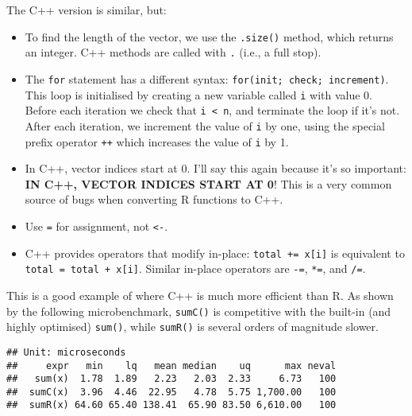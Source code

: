 The C++ version is similar, but:

\begin{itemize}
\item
  To find the length of the vector, we use the \texttt{.size()} method,
  which returns an integer. C++ methods are called with \texttt{.}
  (i.e., a full stop).
\item
  The \texttt{for} statement has a different syntax:
  \texttt{for(init;\ check;\ increment)}. This loop is initialised by
  creating a new variable called \texttt{i} with value 0. Before each
  iteration we check that \texttt{i\ \textless{}\ n}, and terminate the
  loop if it's not. After each iteration, we increment the value of
  \texttt{i} by one, using the special prefix operator \texttt{++} which
  increases the value of \texttt{i} by 1.
\item
  In C++, vector indices start at 0. I'll say this again because it's so
  important: \textbf{IN C++, VECTOR INDICES START AT 0}! This is a very
  common source of bugs when converting R functions to C++.
\item
  Use \texttt{=} for assignment, not \texttt{\textless{}-}.
\item
  C++ provides operators that modify in-place:
  \texttt{total\ +=\ x{[}i{]}} is equivalent to
  \texttt{total\ =\ total\ +\ x{[}i{]}}. Similar in-place operators are
  \texttt{-=}, \texttt{*=}, and \texttt{/=}.
\end{itemize}

This is a good example of where C++ is much more efficient than R. As
shown by the following microbenchmark, \texttt{sumC()} is competitive
with the built-in (and highly optimised) \texttt{sum()}, while
\texttt{sumR()} is several orders of magnitude slower.

\begin{Shaded}
\begin{Highlighting}[]
\StringTok{ }\NormalTok{(}\NormalTok{)}
\NormalTok{(}
\NormalTok{)}
\end{Highlighting}
\end{Shaded}

\begin{verbatim}
## Unit: microseconds
##     expr   min    lq   mean median    uq      max neval
##   sum(x)  1.78  1.89   2.23   2.03  2.33     6.73   100
##  sumC(x)  3.96  4.46  22.95   4.78  5.75 1,700.00   100
##  sumR(x) 64.60 65.40 138.41  65.90 83.50 6,610.00   100
\end{verbatim}


